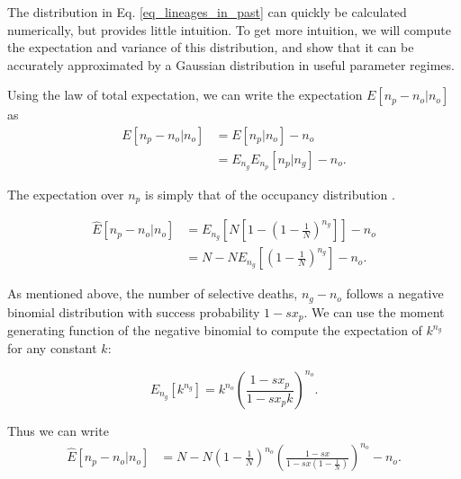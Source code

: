 \documentclass[review]{elsarticle}
\newcommand{\sgcomment}[1]{{\color{red}{SG: #1}}}
\begin{document}
The distribution in Eq. \ref{eq_lineages_in_past} can quickly be calculated numerically, but
provides little intuition. To get more intuition, we will compute the
expectation and variance of this distribution, and show that it can be accurately approximated by a
Gaussian distribution in useful parameter regimes.

Using the law of total expectation, we can write the expectation $E[n_p-n_o | n_o]$ as 
\begin{equation*}
  \begin{aligned}
    \label{eq_lineages_approx}
    E[n_p-n_o | n_o] &=        E[n_p | n_o]       - n_o \\
                     &=E_{n_g} E_{n_p}[n_p | n_g] - n_o.
  \end{aligned}
\end{equation*}

The expectation over $n_p$ is simply that of the occupancy distribution \cite{Wakeley2009}.

\begin{equation*}
  \begin{aligned}
    \label{eq_lineages_derive}
    \hat{E}[n_p -n_o | n_o]
    & =   E_{n_g}\left[N\left[1-\left(1 - \frac{1}{N} \right)^{n_g} \right]\right]- n_o\\
    & =   N-N  E_{n_g}\left[\left(1 - \frac{1}{N} \right)^{n_g} \right] -n_o. 
  \end{aligned}
\end{equation*}

As mentioned above, the number of selective deaths, $n_g-n_o$ follows a negative binomial
distribution with success probability $1-s x_p$. We can use the moment generating function of the negative binomial to compute the
expectation of $k^{n_g}$ for any constant $k$:

\begin{equation}
E_{n_g}[k^{n_g}] = k^{n_o}  \left(\frac{1-sx_p}{1-sx_pk}\right)^{n_o}.
\label{eq_identity}
\end{equation} 


Thus we can write 
\begin{align}
  \label{eq_gauss_mean}
  \hat{E}[n_p -n_o | n_o] &= N-N\left( 1 - \frac{1}{N} \right)^{n_o}\left( \frac{1-sx}{1-sx \left( 1 - \frac{1}{N} \right)}\right)^{n_o}-n_o.
\end{align}
\end{document}
